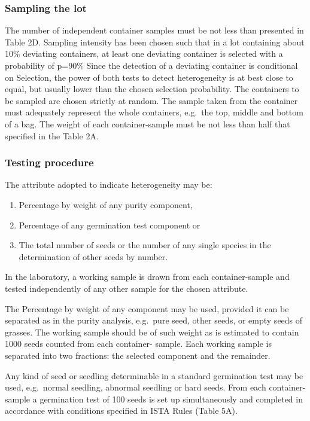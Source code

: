 \documentclass[]{book}
\begin{document}
\subsubsection{Sampling the lot}\label{sampling-the-lot}

The number of independent container samples must be not less than
presented in Table 2D. Sampling intensity has been chosen such that in a
lot containing about 10\% deviating containers, at least one deviating
container is selected with a probability of p=90\% Since the detection
of a deviating container is conditional on Selection, the power of both
tests to detect heterogeneity is at best close to equal, but usually
lower than the chosen selection probability. The containers to be
sampled are chosen strictly at random. The sample taken from the
container must adequately represent the whole containers, e.g.~the top,
middle and bottom of a bag. The weight of each container-sample must be
not less than half that specified in the Table 2A.

\subsubsection{Testing procedure}\label{testing-procedure}

The attribute adopted to indicate heterogeneity may be:

\begin{enumerate}
\def\labelenumi{\alph{enumi})}
\item
  Percentage by weight of any purity component,
\item
  Percentage of any germination test component or
\item
  The total number of seeds or the number of any single species in the
  determination of other seeds by number.
\end{enumerate}

In the laboratory, a working sample is drawn from each container-sample
and tested independently of any other sample for the chosen attribute.

The Percentage by weight of any component may be used, provided it can
be separated as in the purity analysis, e.g.~pure seed, other seeds, or
empty seeds of grasses. The working sample should be of such weight as
is estimated to contain 1000 seeds counted from each container- sample.
Each working sample is separated into two fractions: the selected
component and the remainder.

Any kind of seed or seedling determinable in a standard germination test
may be used, e.g.~normal seedling, abnormal seedling or hard seeds. From
each container- sample a germination test of 100 seeds is set up
simultaneously and completed in accordance with conditions specified in
ISTA Rules (Table 5A).
\end{document}

